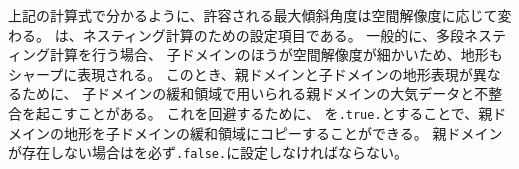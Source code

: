 上記の計算式で分かるように、許容される最大傾斜角度は空間解像度に応じて変わる。
は、ネスティング計算のための設定項目である。
一般的に、多段ネスティング計算を行う場合、
子ドメインのほうが空間解像度が細かいため、地形もシャープに表現される。
このとき、親ドメインと子ドメインの地形表現が異なるために、
子ドメインの緩和領域で用いられる親ドメインの大気データと不整合を起こすことがある。
これを回避するために、
を\verb|.true.|とすることで、親ドメインの地形を子ドメインの緩和領域にコピーすることができる。
親ドメインが存在しない場合はを必ず\verb|.false.|に設定しなければならない。

